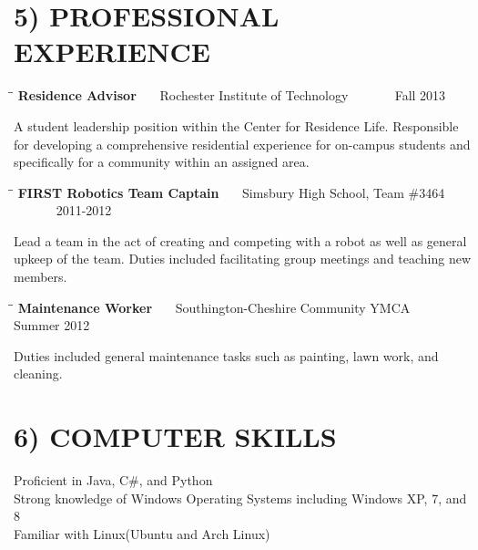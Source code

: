 \documentclass{res}
\begin{document}
\begin{resume}
\section{5) PROFESSIONAL EXPERIENCE}
    \vspace{-5pt}
    \begin{tabbing}%
   \hspace{2.3in}\= \hspace{2.6in}\= \kill %
   {\bf Residence Advisor }  \>~~~Rochester Institute of Technology \> ~~~~~~ Fall 2013\\
   \end{tabbing}\vspace{-30pt}
    A student leadership position within the Center for Residence Life. 
    Responsible for developing a comprehensive residential experience for on-campus students
    and specifically for a community within an assigned area.
   \begin{tabbing}
   \hspace{2.3in}\= \hspace{2.6in}\= \kill %
    {\bf FIRST Robotics Team Captain} \>~~~Simsbury High School, Team \#3464 \> ~~~~~~ 2011-2012\\
   \end{tabbing}\vspace{-30pt}
    Lead a team in the act of creating and competing with a robot as well as general upkeep of the team.
    Duties included facilitating group meetings and teaching new members.
    \vspace{-5pt}
   \begin{tabbing}%
   \hspace{2.3in}\= \hspace{2.6in}\= \kill %
   {\bf Maintenance Worker }  \>~~~Southington-Cheshire Community YMCA \> ~~~~~~ Summer 2012\\
   \end{tabbing}\vspace{-30pt}
    Duties included general maintenance tasks such as painting, lawn work,
    and cleaning. 
    
\section{6) COMPUTER SKILLS}   
    \vspace{2pt}       
    Proficient in Java, C\#, and Python\\
    Strong knowledge of Windows Operating Systems including Windows XP, 7, and 8\\
    Familiar with Linux(Ubuntu and Arch Linux)
    \vspace{-5pt}
    

\end{resume}
\end{document}
